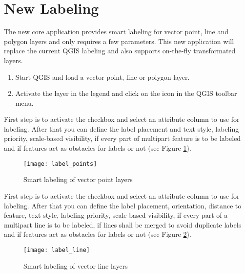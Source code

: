 
\section{New Labeling}


The new  core application provides smart labeling 
for vector point,  line and polygon layers and only requires a few parameters. 
This new application will replace the current QGIS labeling and also supports 
on-the-fly transformated layers.

\begin{enumerate}
  \item Start QGIS and load a vector point, line or polygon layer. 
  \item Activate the layer in the legend and click on the 
   icon in the QGIS toolbar menu.
\end{enumerate}


First step is to activate the  checkbox and select an attribute 
column to use for labeling. After that you can define the label placement and text style, 
labeling priority, scale-based visibility, if every part of multipart feature is to be 
labeled and if features act as obstacles for labels or not (see Figure \ref{fig:pointlabel}).  

\begin{figure}[ht]
\centering
   \texttt{[image: label\_points]}
   \caption{Smart labeling of vector point layers \nixcaption}\label{fig:pointlabel}
\end{figure}


First step is to activate the  checkbox and select an attribute
column to use for labeling. After that you can define the label placement, orientation, 
distance to feature, text style, labeling priority, scale-based visibility, if every part 
of a multipart line is to be labeled, if lines shall be merged to avoid duplicate labels 
and if features act as obstacles for labels or not (see Figure \ref{fig:linelabel}).

\begin{figure}[ht]
\centering
   \texttt{[image: label\_line]}
   \caption{Smart labeling of vector line layers \nixcaption}\label{fig:linelabel}
\end{figure}

